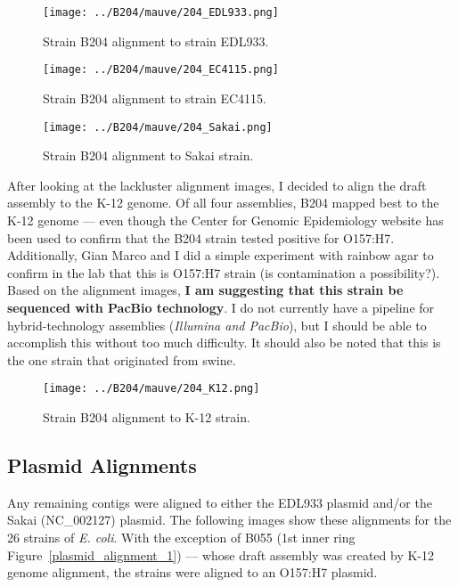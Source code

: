 \documentclass[11pt]{article}
\begin{document}
\begin{figure}[h!]\normalsize %
\centering
\texttt{[image: ../B204/mauve/204\_EDL933.png]}
\caption{Strain B204 alignment to strain EDL933.}
\label{alignment_EDL933}
\end{figure}

\begin{figure}[h!]\normalsize %
\centering
\texttt{[image: ../B204/mauve/204\_EC4115.png]}
\caption{Strain B204 alignment to strain EC4115.}
\label{alignment_EC4115}
\end{figure}

\begin{figure}[h!]\normalsize %
\centering
\texttt{[image: ../B204/mauve/204\_Sakai.png]}
\caption{Strain B204 alignment to Sakai strain.}
\label{alignment_Sakai}
\end{figure}

\clearpage

After looking at the lackluster alignment images, I decided to align the draft assembly to the K-12 genome. Of all four assemblies, B204 mapped best to the K-12 genome --- even though the Center for Genomic Epidemiology website has been used to confirm that the B204 strain tested positive for O157:H7. Additionally, Gian Marco and I did a simple experiment with rainbow agar to confirm in the lab that this is O157:H7 strain (is contamination a possibility?). Based on the alignment images, \textbf{I am suggesting that this strain be sequenced with PacBio technology}. I do not currently have a pipeline for hybrid-technology assemblies (\textit{Illumina and PacBio}), but I should be able to accomplish this without too much difficulty. It should also be noted that this is the one strain that originated from swine. 

\begin{figure}[h!]\normalsize %
\centering
\texttt{[image: ../B204/mauve/204\_K12.png]}
\caption{Strain B204 alignment to K-12 strain.}
\label{alignment_K12}
\end{figure}

\subsection*{Plasmid Alignments}
Any remaining contigs were aligned to either the EDL933 plasmid and/or the Sakai (NC\_002127) plasmid. The following images show these alignments for the 26 strains of \textit{E. coli}. With the exception of B055 (1st inner ring Figure~\ref{plasmid_alignment_1}) --- whose draft assembly was created by K-12 genome alignment, the strains were aligned to an O157:H7 plasmid. 
\end{document}
